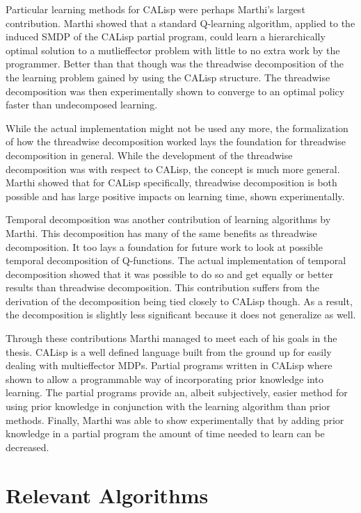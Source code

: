 \documentclass[jair,twoside,11pt,theapa]{article}
\begin{document}
Particular learning methods for CALisp were perhaps Marthi's largest contribution. Marthi showed that a standard Q-learning algorithm, applied to the induced SMDP of the CALisp partial program, could learn a hierarchically optimal solution to a mutlieffector problem with little to no extra work by the programmer. Better than that though was the threadwise decomposition of the the learning problem gained by using the CALisp structure. The threadwise decomposition was then experimentally shown to converge to an optimal policy faster than undecomposed learning. 

While the actual implementation might not be used any more, the formalization of how the threadwise decomposition worked lays the foundation for threadwise decomposition in general. While the development of the threadwise decomposition was with respect to CALisp, the concept is much more general. Marthi showed that for CALisp specifically, threadwise decomposition is both possible and has large positive impacts on learning time, shown experimentally.  

Temporal decomposition was another contribution of learning algorithms by Marthi. This decomposition has many of the same benefits as threadwise decomposition. It too lays a foundation for future work to look at possible temporal decomposition of Q-functions. The actual implementation of temporal decomposition showed that it was possible to do so and get equally or better results than threadwise decomposition. This contribution suffers from the derivation of the decomposition being tied closely to CALisp though. As a result, the decomposition is slightly less significant because it does not generalize as well.

Through these contributions Marthi managed to meet each of his goals in the thesis. CALisp is a well defined language built from the ground up for easily dealing with multieffector MDPs. Partial programs written in CALisp where shown to allow a programmable way of incorporating prior knowledge into learning. The partial programs provide an, albeit subjectively, easier method for using prior knowledge in conjunction with the learning algorithm than prior methods. Finally, Marthi was able to show experimentally that by adding prior knowledge in a partial program the amount of time needed to learn can be decreased. 

\section{Relevant Algorithms}
\label{relevant Algors}
\end{document}
